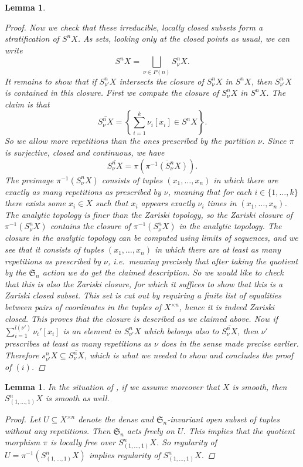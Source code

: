 \documentclass[12pt,a4paper]{amsart}
\theoremstyle{plain}
\newtheorem{lm}[thm]{Lemma}
\theoremstyle{definition}
\theoremstyle{remark}
\begin{document}
\begin{lm}
\begin{proof}
    Now we check that these irreducible, locally closed subsets form a stratification of $S^{n}X$.
    As sets, looking only at the closed points as usual, we can write
    \[ S^{n}X = \bigsqcup_{\nu \in P(n)} S^{n}_{\nu}X. \]
    It remains to show that if $S^{n}_{\nu'}X$ intersects the closure of $S^{n}_{\nu}X$ in $S^{n}X$, then $S^{n}_{\nu'}X$ is contained in this closure.
    First we compute the closure of $S^{n}_{\nu}X$ in $S^{n}X$.
    The claim is that
    \[ \overline{S^{n}_{\nu}X} = \left\{ \sum_{i=1}^{k} \nu_{i} [x_{i}] \in S^{n}X \right\}. \]
    So we allow more repetitions than the ones prescribed by the partition $\nu$.
    Since $\pi$ is surjective, closed and continuous, we have
    \[ \overline{S^{n}_{\nu}X} = \pi(\overline{\pi^{-1}(S^{n}_{\nu}X)}). \]
    The preimage $\pi^{-1}(S^{n}_{\nu}X)$ consists of tuples $(x_{1}, \ldots, x_{n})$ in which there are exactly as many repetitions as prescribed by $\nu$, meaning that for each $i \in \{1, \ldots, k\}$ there exists some $x_{i} \in X$ such that $x_{i}$ appears exactly $\nu_{i}$ times in $(x_{1}, \ldots, x_{n})$.
    The analytic topology is finer than the Zariski topology, so the Zariski closure of $\pi^{-1}(S^{n}_{\nu}X)$ contains the closure of $\pi^{-1}(S^{n}_{\nu}X)$ in the analytic topology.
    The closure in the analytic topology can be computed using limits of sequences, and we see that it consists of tuples $(x_{1}, \ldots, x_{n})$ in which there are at least as many repetitions as prescribed by $\nu$, i.e.~meaning precisely that after taking the quotient by the $\mathfrak{S}_{n}$ action we do get the claimed description.
    So we would like to check that this is also the Zariski closure, for which it suffices to show that this is a Zariski closed subset.
    This set is cut out by requiring a finite list of equalities between pairs of coordinates in the tuples of $X^{\times n}$, hence it is indeed Zariski closed.
    This proves that the closure is described as we claimed above.
    Now if $\sum_{i=1}^{l(\nu')}\nu_{i}'[x_{i}]$ is an element in $S^{n}_{\nu'}X$ which belongs also to $\overline{S^{n}_{\nu}X}$, then $\nu'$ prescribes at least as many repetitions as $\nu$ does in the sense made precise earlier.
    Therefore $s^{n}_{\nu'}X \subseteq \overline{S^{n}_{\nu}X}$, which is what we needed to show and concludes the proof of $(i)$.
  \end{proof}
\end{lm}

\begin{lm}\label{lm:smoothstratum}
  In the situation of , if we assume moreover that $X$ is smooth, then $S^{n}_{(1, \ldots, 1)}X$ is smooth as well.
  
  \begin{proof}
    Let $U \subseteq X^{\times n}$ denote the dense and $\mathfrak{S}_{n}$-invariant open subset of tuples without any repetitions.
    Then $\mathfrak{S}_{n}$ acts freely on $U$.
    This implies that the quotient morphism $\pi$ is locally free over $S^{n}_{(1,\ldots,1)}X$.
    So regularity of $U = \pi^{-1}(S^{n}_{(1, \ldots, 1)}X)$ implies regularity of $S^{n}_{(1, \ldots, 1)}X$.
  \end{proof}
\end{lm}
\end{document}

